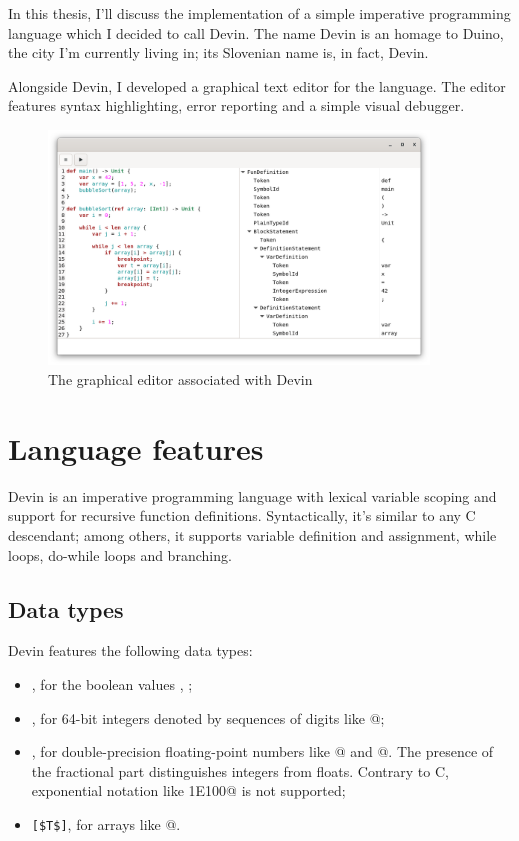\documentclass[UdineBachThesis,american,11pt]{PhdThesis}
\begin{document}
  In this thesis, I'll discuss the implementation of a simple imperative
  programming language which I decided to call Devin. The name Devin is an
  homage to Duino, the city I'm currently living in; its Slovenian name is, in
  fact, Devin.

  Alongside Devin, I developed a graphical text editor for the language. The
  editor features syntax highlighting, error reporting and a simple visual
  debugger.

  \begin{figure}[h]
    \centering
    \includegraphics[width=0.9\textwidth]{2.png}
    \caption{The graphical editor associated with Devin}
  \end{figure}

  \section{Language features}

  Devin is an imperative programming language with lexical variable scoping and
  support for recursive function definitions. Syntactically, it's similar to any
  C descendant; among others, it supports variable definition and assignment,
  while loops, do-while loops and branching.

  \subsection{Data types}

  Devin features the following data types:

  \begin{itemize}
    \item \lstinline@Bool@, for the boolean values \lstinline@true@,
    \lstinline@false@;

    \item \lstinline@Int@, for 64-bit integers denoted by sequences of digits
    like @;

    \item \lstinline@Float@, for double-precision floating-point numbers like
    @ and @. The presence of the fractional part
    distinguishes integers from floats. Contrary to C, exponential notation like
    \lstinline@1E100@ is not supported;

    \item \lstinline[mathescape]@[$T$]@, for arrays like
    \lstinline@[1, 1, 2, 3, 5, 8, 13, 21, 34, 55]@.
  \end{itemize}
\end{document}

